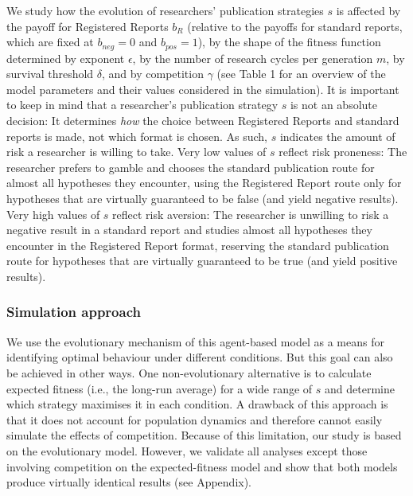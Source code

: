 \documentclass[
  ,man,mask,floatsintext]{apa6}
\begin{document}
We study how the evolution of researchers' publication strategies \(s\) is affected by the payoff for Registered Reports \(b_{R}\) (relative to the payoffs for standard reports, which are fixed at \(b_{neg} = 0\) and \(b_{pos} = 1\)), by the shape of the fitness function determined by exponent \(\epsilon\), by the number of research cycles per generation \(m\), by survival threshold \(\delta\), and by competition \(\gamma\) (see Table 1 for an overview of the model parameters and their values considered in the simulation).
It is important to keep in mind that a researcher's publication strategy \(s\) is
not an absolute decision:
It determines \emph{how} the choice between Registered Reports and standard reports is made, not which format is chosen.
As such, \(s\) indicates the amount of risk a researcher is willing to take.
Very low values of \(s\) reflect risk proneness:
The researcher prefers to gamble and chooses the standard publication route for almost all hypotheses they encounter, using the Registered Report route only for hypotheses that are virtually guaranteed to be false (and yield negative results).
Very high values of \(s\) reflect risk aversion:
The researcher is unwilling to risk a negative result in a standard report and studies almost all hypotheses they encounter in the Registered Report format, reserving the standard publication route for hypotheses that are virtually guaranteed to be true (and yield positive results).

\hypertarget{simulation-approach}{%
\subsubsection{Simulation approach}\label{simulation-approach}}

We use the evolutionary mechanism of this agent-based model as a means for identifying optimal behaviour under different conditions.
But this goal can also be achieved in other ways.
One non-evolutionary alternative is to calculate expected fitness (i.e., the long-run average) for a wide range of \(s\) and determine which strategy maximises it in each condition.
A drawback of this approach is that it does not account for population dynamics and therefore cannot easily simulate the effects of competition.
Because of this limitation, our study is based on the evolutionary model.
However, we validate all analyses except those involving competition on the expected-fitness model and show that both models produce virtually identical results (see Appendix).
\end{document}
